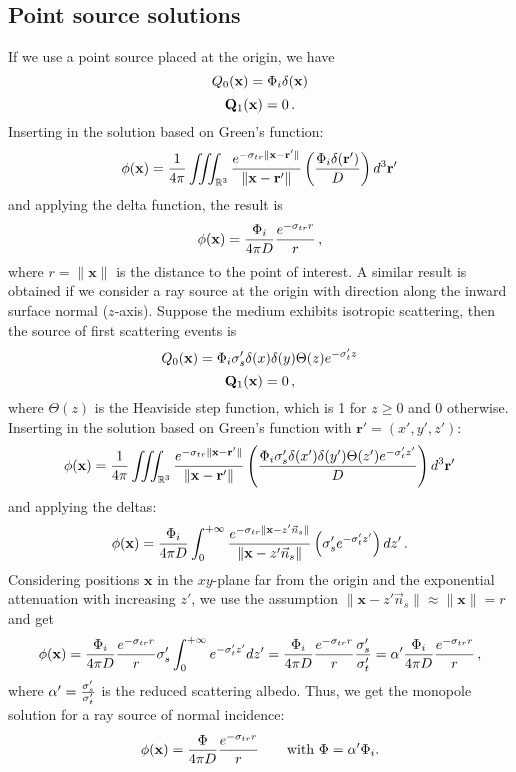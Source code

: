 \documentclass[10pt,a4paper]{article}
\begin{document}
\subsection{Point source solutions}
If we use a point source placed at the origin, we have
$$
{Q_0}(\mathbf{x}) = \Phi_i \delta(\mathbf{x})
$$
$$
\mathbf{Q}_1(\mathbf{x}) = 0 \, .
$$
Inserting in the solution based on Green's function:
$$
{\phi}(\mathbf{x}) = \frac{1}{4 \pi} \iiint_{\mathbb{R}^3} \frac{e^{-\sigma_{tr} \|\mathbf{x} - \mathbf{r}' \|}}{\|\mathbf{x} - \mathbf{r}' \|} \left(\frac{\Phi_i \delta(\mathbf{r}')}{D}\right) d^3 \mathbf{r}'
$$
and applying the delta function, the result is
$$
{\phi}(\mathbf{x}) = \frac{\Phi_i}{4 \pi D} \frac{e^{-\sigma_{tr} r}}{r} \, ,
$$
where $r = \|\mathbf{x}\|$ is the distance to the point of interest. A similar result is obtained if we consider a ray source at the origin with direction along the inward surface normal ($z$-axis). Suppose the medium exhibits isotropic scattering, then the source of first scattering events is~\cite{patterson89}
$$
{Q_0}(\mathbf{x}) = \Phi_i {\sigma}'_s \delta(x) \delta(y) \Theta(z) e^{-{\sigma}'_t z}
$$
$$
\mathbf{Q}_1(\mathbf{x}) = 0 \, ,
$$
where $\Theta(z)$ is the Heaviside step function, which is 1 for $z \geq 0$ and  0 otherwise. Inserting in the solution based on Green's function with $\mathbf{r}' = (x', y', z')$:
$$
{\phi}(\mathbf{x}) = \frac{1}{4 \pi} \iiint_{\mathbb{R}^3} \frac{e^{-\sigma_{tr} \|\mathbf{x} - \mathbf{r}' \|}}{\|\mathbf{x} - \mathbf{r}' \|} \left(   \frac{\Phi_i {\sigma}'_s \delta(x') \delta(y') \Theta(z') e^{-{\sigma}'_t z'}}{D} \right) d^3 \mathbf{r}'
$$
and applying the deltas:
$$
{\phi}(\mathbf{x}) = \frac{\Phi_i}{4 \pi D} \int_{0}^{+\infty} \frac{e^{-\sigma_{tr} \|\mathbf{x} - z' \vec{n}_s \|}}{\|\mathbf{x} - z' \vec{n}_s  \|} \left(  {\sigma}'_s e^{-{\sigma}'_t z'} \right) dz' \, .
$$
Considering positions $\mathbf{x}$ in the $xy$-plane far from the origin and the exponential attenuation with increasing $z'$, we use the assumption $\|\mathbf{x} - z' \vec{n}_s \| \approx \|\mathbf{x}\| = r$ and get
$$
{\phi}(\mathbf{x}) = \frac{\Phi_i}{4 \pi D} \frac{e^{-\sigma_{tr} r}}{r} {\sigma}'_s \int_{0}^{+\infty} e^{-{\sigma}'_t z'} dz' = \frac{\Phi_i}{4 \pi D} \frac{e^{-\sigma_{tr} r}}{r} \frac{{\sigma}'_s}{{\sigma}'_t} = \alpha' \frac{\Phi_i}{4 \pi D} \frac{e^{-\sigma_{tr} r}}{r} \, ,
$$
where $\alpha' = \frac{{\sigma}'_s}{{\sigma}'_t}$ is the reduced scattering albedo. Thus, we get the monopole solution for a ray source of normal incidence:
\begin{equation} \label{eq:monopoint}
{\phi}(\mathbf{x}) = \frac{\Phi}{4 \pi D} \frac{e^{-\sigma_{tr} r}}{r} \qquad \text{with $\Phi = \alpha' \Phi_i$.}
\end{equation}
\end{document}
